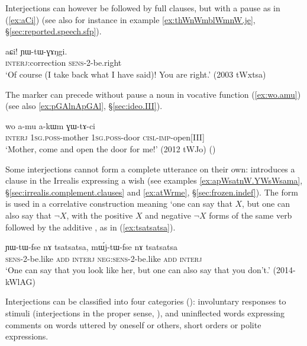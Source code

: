Interjections can however be followed by full clauses, but with a pause as in (\ref{ex:aCi}) (see also for instance  in example \ref{ex:thWnWmblWmnW.je}, §\ref{sec:reported.speech.sfp}).

\begin{exe}
\ex \label{ex:aCi}
\gll aɕi! ɲɯ-tɯ-ɣɤŋgi.  \\
\textsc{interj}:correction \textsc{sens}-2-be.right \\
\glt `Of course (I take back what I have said)! You are right.' (2003 tWxtsa)
\end{exe} 


The marker  can precede without pause a noun in vocative function (\ref{ex:wo.amu}) (see also \ref{ex:pGAlnApGAl}, §\ref{sec:ideo.III}).
  
\begin{exe}
\ex \label{ex:wo.amu}
\gll wo a-mu a-kɯm ɣɯ-tɤ-ci  \\
\textsc{interj} \textsc{1sg}.\textsc{poss}-mother  \textsc{1sg}.\textsc{poss}-door \textsc{cisl}-\textsc{imp}-open[III] \\
\glt `Mother, come and open the door for me!' (2012 tWJo) 	()
\end{exe} 

Some interjections cannot form a complete utterance on their own:   introduces a clause in the Irrealis expressing a wish (see examples \ref{ex:apWsatnW.YWsWsama}, §\ref {sec:irrealis.complement.clauses} and \ref{ex:atWrme}, §\ref{sec:frozen.indef}). The form  is used in a correlative construction meaning  `one can say that $X$, but one can also say that $\neg X$, with the positive $X$ and negative $\neg X$ forms of the same verb followed by the additive , as in (\ref{ex:tsatsatsa}).

\begin{exe}
\ex \label{ex:tsatsatsa}
\gll ɲɯ-tɯ-fse nɤ tsatsatsa, mɯ́j-tɯ-fse nɤ tsatsatsa \\
\textsc{sens}-2-be.like \textsc{add} \textsc{interj} \textsc{neg}:\textsc{sens}-2-be.like \textsc{add} \textsc{interj} \\
\glt  `One can say that you look like her, but one can also say that you don't.' (2014-kWlAG)
\end{exe}



Interjections can be classified into four categories (): involuntary responses to stimuli (interjections in the proper sense, \citealt{dingemanse11phd}), and uninflected words expressing comments on words uttered by oneself or others, short orders or polite expressions.
  
